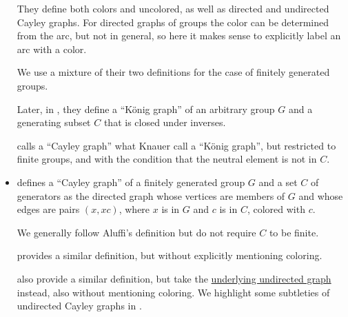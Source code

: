 \begin{remark}
\begin{itemize}
    They define both colors and uncolored, as well as directed and undirected Cayley graphs. For directed graphs of groups the color can be determined from the arc, but not in general, so here it makes sense to explicitly label an arc with a color.

    We use a mixture of their two definitions for the case of finitely generated groups.

    Later, in \cite[def. 7.3.2]{Knauer2019AlgebraicGraphTheory}, they define a \enquote{K\"onig graph} of an arbitrary group \( G \) and a generating subset \( C \) that is closed under inverses.

     calls a \enquote{Cayley graph} what Knauer call a \enquote{K\"onig graph}, but restricted to finite groups, and with the condition that the neutral element is not in \( C \).

    \item {} defines a \enquote{Cayley graph} of a finitely generated group \( G \) and a set \( C \) of generators as the directed graph whose vertices are members of \( G \) and whose edges are pairs \( (x, xc) \), where \( x \) is in \( G \) and \( c \) is in \( C \), colored with \( c \).

    We generally follow Aluffi's definition but do not require \( C \) to be finite.

     provides a similar definition, but without explicitly mentioning coloring.

     also provide a similar definition, but take the \hyperref[def:multigraph_orientation]{underlying undirected graph} instead, also without mentioning coloring. We highlight some subtleties of undirected Cayley graphs in .
  \end{itemize}
\end{remark}

